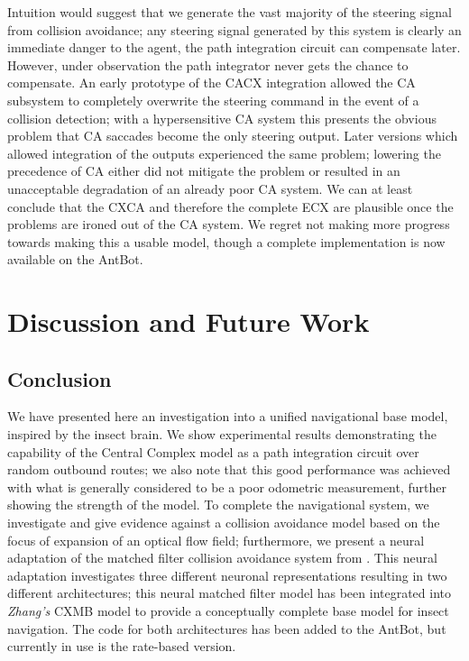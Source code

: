 \documentclass[a4paper,11pt,twoside,openright]{article}
\let\oldsection\section
\def\section{\cleardoublepage\oldsection}
\begin{document}
Intuition would suggest that we generate the vast majority of the
steering signal from collision avoidance; any steering signal
generated by this system is clearly an immediate danger to the agent,
the path integration circuit can compensate later. However, under
observation the path integrator never gets the chance to
compensate. An early prototype of the CACX integration allowed the CA
subsystem to completely overwrite the steering command in the event of
a collision detection; with a hypersensitive CA system this presents
the obvious problem that CA saccades become the only steering output.
Later versions which allowed integration of the outputs experienced
the same problem; lowering the precedence of CA either did not
mitigate the problem or resulted in an unacceptable degradation of an
already poor CA system. We can at least conclude that the CXCA and
therefore the complete ECX are plausible once the problems are ironed
out of the CA system. We regret not making more progress towards
making this a usable model, though a complete implementation is now
available on the AntBot.
\newpage


\section{ Discussion and Future Work}
\subsection{Conclusion}
We have presented here an investigation into a unified navigational
base model, inspired by the insect brain. We show experimental results
demonstrating the capability of the Central Complex model as a path
integration circuit over random outbound routes; we also note that
this good performance was achieved with what is generally considered
to be a poor odometric measurement, further showing the strength of
the model. To complete the navigational system, we investigate and
give evidence against a collision avoidance model based on the focus
of expansion of an optical flow field; furthermore, we present a
neural adaptation of the matched filter collision avoidance system
from \cite{Mitchell2018}. This neural adaptation investigates three
different neuronal representations resulting in two different
architectures; this neural matched filter model has been integrated
into \textit{Zhang's} CXMB model to provide a conceptually complete
base model for insect navigation. The code for both architectures
has been added to the AntBot, but currently in use is the rate-based
version.\newline\par
\end{document}
